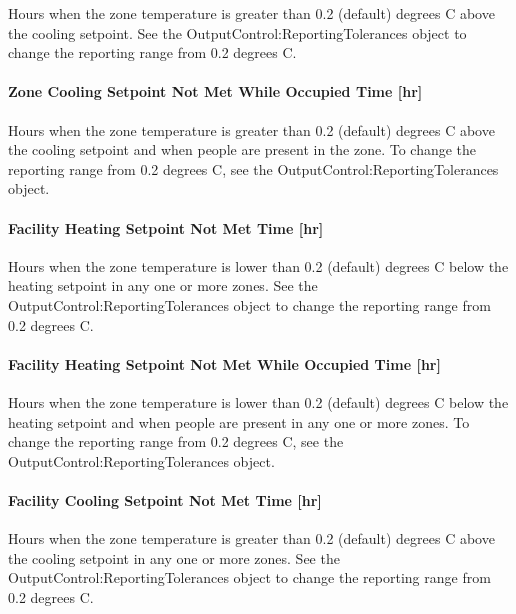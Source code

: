 Hours when the zone temperature is greater than 0.2 (default) degrees C above the cooling setpoint. See the OutputControl:ReportingTolerances object to change the reporting range from 0.2 degrees C.

\paragraph{Zone Cooling Setpoint Not Met While Occupied Time {[}hr{]}}\label{zone-cooling-setpoint-not-met-while-occupied-time-hr}

Hours when the zone temperature is greater than 0.2 (default) degrees C above the cooling setpoint and when people are present in the zone. To change the reporting range from 0.2 degrees C, see the OutputControl:ReportingTolerances object.

\paragraph{Facility Heating Setpoint Not Met Time {[}hr{]}}\label{facility-heating-setpoint-not-met-time-hr}

Hours when the zone temperature is lower than 0.2 (default) degrees C below the heating setpoint in any one or more zones. See the OutputControl:ReportingTolerances object to change the reporting range from 0.2 degrees C.

\paragraph{Facility Heating Setpoint Not Met While Occupied Time {[}hr{]}}\label{facility-heating-setpoint-not-met-while-occupied-time-hr}

Hours when the zone temperature is lower than 0.2 (default) degrees C below the heating setpoint and when people are present in any one or more zones. To change the reporting range from 0.2 degrees C, see the OutputControl:ReportingTolerances object.

\paragraph{Facility Cooling Setpoint Not Met Time {[}hr{]}}\label{facility-cooling-setpoint-not-met-time-hr}

Hours when the zone temperature is greater than 0.2 (default) degrees C above the cooling setpoint in any one or more zones. See the OutputControl:ReportingTolerances object to change the reporting range from 0.2 degrees C.

